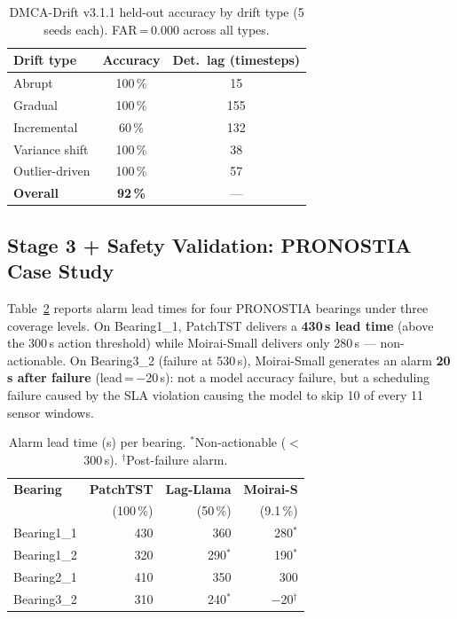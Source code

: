 \documentclass[12pt,a4paper]{article}
\begin{document}
\begin{table}[ht]
\centering
\caption{DMCA-Drift v3.1.1 held-out accuracy by drift type
  (5 seeds each). FAR\,=\,0.000 across all types.}
\label{tab:drift}
\small
\begin{tabular}{@{}lcc@{}}
\toprule
\textbf{Drift type} & \textbf{Accuracy} & \textbf{Det.\ lag (timesteps)}\\
\midrule
Abrupt          & 100\,\% & 15 \\
Gradual         & 100\,\% & 155 \\
Incremental     &  60\,\% & 132 \\
Variance shift  & 100\,\% & 38 \\
Outlier-driven  & 100\,\% & 57 \\
\midrule
\textbf{Overall} & \textbf{92\,\%} & --- \\
\bottomrule
\end{tabular}
\end{table}

\subsection{Stage 3 + Safety Validation: PRONOSTIA Case Study}
\label{subsec:results-pronostia}

Table~\ref{tab:pronostia} reports alarm lead times for four
PRONOSTIA bearings under three coverage levels.
On Bearing1\_1, PatchTST delivers a \textbf{430\,s lead time}
(above the 300\,s action threshold) while Moirai-Small delivers
only 280\,s --- non-actionable.
On Bearing3\_2 (failure at 530\,s), Moirai-Small generates an alarm
\textbf{20\,s after failure} (lead\,=\,$-$20\,s): not a model
accuracy failure, but a scheduling failure caused by the SLA
violation causing the model to skip 10 of every 11 sensor windows.

\begin{table}[ht]
\centering
\caption{Alarm lead time (s) per bearing. ${}^*$Non-actionable
  ($<$300\,s). ${}^\dagger$Post-failure alarm.}
\label{tab:pronostia}
\small
\begin{tabular}{@{}lrrr@{}}
\toprule
\textbf{Bearing} & \textbf{PatchTST} & \textbf{Lag-Llama} & \textbf{Moirai-S}\\
                 & \small(100\,\%)& \small(50\,\%) & \small(9.1\,\%)\\
\midrule
Bearing1\_1 & 430 & 360 & 280${}^*$ \\
Bearing1\_2 & 320 & 290${}^*$ & 190${}^*$ \\
Bearing2\_1 & 410 & 350 & 300 \\
Bearing3\_2 & 310 & 240${}^*$ & $-$20${}^\dagger$ \\
\bottomrule
\end{tabular}
\end{table}
\end{document}
